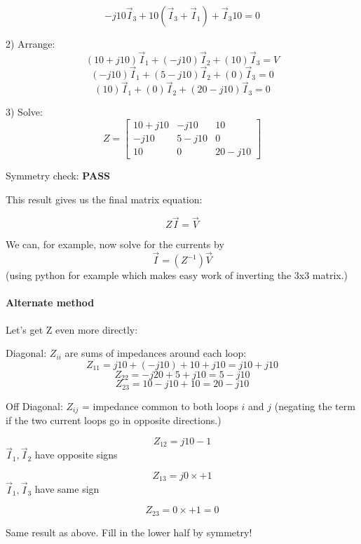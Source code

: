  \[
 -j10\vec{I}_3 + 10(\vec{I}_3 + \vec{I}_1) + \vec{I}_3 10 = 0
  \]

2) Arrange:
  \[
  (10 + j10)\vec{I}_1 + (-j10)\vec{I}_2 + (10)\vec{I}_3 = V
  \]
  \[
  (-j10)\vec{I}_1 + (5 - j10)\vec{I}_2 + (0)\vec{I}_3 = 0
  \]
  \[
  (10)\vec{I}_1 + (0)\vec{I}_2 + (20 - j10)\vec{I}_3 = 0
  \]

3) Solve:
\[Z = \begin{bmatrix}
10 + j10 & -j10 & 10 \\
-j10 & 5 - j10 & 0 \\
10 & 0 & 20 - j10
\end{bmatrix}\]

Symmetry check: {\bf PASS}

\vspace{0.2in}
This result gives us the final matrix equation:

\[
Z\vec{I} = \vec{V}
\]

We can, for example, now solve for the currents by
\[
\vec I = (Z^{-1}) \vec V
\]
(using python for example which makes easy work of inverting the 3x3 matrix.)

\paragraph{Alternate method}

Let's get Z even more directly:

Diagonal: $Z_{ii}$ are sums of impedances around each loop:
\[Z_{11} = j10 + (-j10) + 10 + j10 = j10 + j10\]
\[Z_{22} = -j20 + 5 + j10 = 5 - j10\]
\[Z_{23} = 10 - j10 + 10 = 20 - j10\]

Off Diagonal: $Z_{ij}$ = impedance common to both loops $i$ and $j$ (negating the term
if the two current loops go in opposite directions.)

\[
Z_{12} = j10 -1
\]
$\vec{I}_1, \vec{I}_2$ have opposite signs

\[
Z_{13} = j0 \times +1
\]
$\vec{I}_1, \vec{I}_3$ have same sign

\[
Z_{23} = 0 \times +1 = 0
\]

Same result as above.
Fill in the lower half by symmetry!



